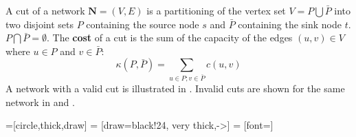 \begin{definition}[Cut]
	A cut of a network $\textbf{N} = (V,E)$ is a partitioning of the vertex set $V = P \bigcup \bar{P}$ into two disjoint sets $P$ containing the source node $s$ and $\bar{P}$ containing the sink node $t$. $P \bigcap \bar{P} = \emptyset$.
	The \textbf{cost} of a cut is the sum of the capacity of the edges $(u,v) \in V$ where $u \in P$ and $v \in \bar{P}$:
	\begin{equation}
	\kappa (P, \bar{P}) = \sum_{u \in P; v \in \bar{P}} c(u,v)
	\end{equation}
	A network with a valid cut is illustrated in . Invalid cuts are shown for the same network in  and .
\end{definition}

=[circle,thick,draw]
 = [draw=black!24, very thick,->]
 = [font=\small]
